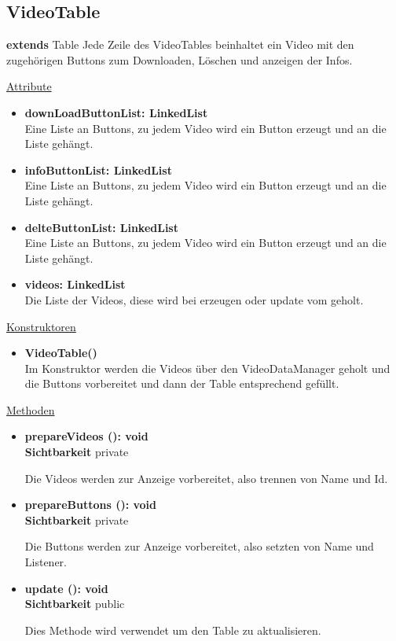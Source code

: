 \newpage
\subsection{VideoTable}\label{VideoTable}
\textbf{extends}  Table \newline
Jede Zeile des VideoTables beinhaltet ein Video mit den zugehörigen Buttons zum Downloaden, Löschen und anzeigen der Infos.

\underline{Attribute}
\begin{itemize}
\itemsep0pt

\item \textbf{downLoadButtonList: LinkedList} \hfill\\ 
Eine Liste an Buttons, zu jedem Video wird ein Button erzeugt und an die Liste gehängt.

\item \textbf{infoButtonList: LinkedList} \hfill\\ 
Eine Liste an Buttons, zu jedem Video wird ein Button erzeugt und an die Liste gehängt.

\item \textbf{delteButtonList: LinkedList} \hfill\\ 
Eine Liste an Buttons, zu jedem Video wird ein Button erzeugt und an die Liste gehängt.

\item \textbf{videos: LinkedList} \hfill\\ 
Die Liste der Videos, diese wird bei erzeugen oder update vom  geholt.
\end{itemize}

\underline{Konstruktoren}
\begin{itemize}
\itemsep0pt

\item \textbf{VideoTable()} \hfill\\ 
Im Konstruktor werden die Videos über den VideoDataManager geholt und die Buttons vorbereitet und dann der Table entsprechend gefüllt.

\end{itemize}


\underline{Methoden}
\begin{itemize}
\itemsep0pt

\item \textbf{prepareVideos (): void}\hfill\\
\textbf{Sichtbarkeit} private

Die Videos werden zur Anzeige vorbereitet, also trennen von Name und Id.

\item \textbf{prepareButtons (): void}\hfill\\
\textbf{Sichtbarkeit} private

Die Buttons werden zur Anzeige vorbereitet, also setzten von Name und Listener.

\item \textbf{update (): void}\hfill\\
\textbf{Sichtbarkeit} public

Dies Methode wird verwendet um den Table zu aktualisieren.

\end{itemize}